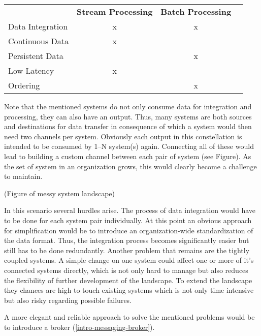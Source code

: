 \begin{table}[h]
\begin{tabular}{l|c|cl}
\multicolumn{1}{c|}{\textbf{}} & \textbf{Stream Processing} & \textbf{Batch
Processing} & \multicolumn{1}{c}{\textbf{}} \\ \cline{1-3}
Data Integration               & x                          & x
&                               \\
Continuous Data                & x                          &
&                               \\
Persistent Data                &                            & x
&                               \\
Low Latency                    & x                          &
&                               \\
Ordering                       &                            & x
&
\end{tabular}
\end{table}

Note that the mentioned systems do not only consume data for integration and
processing, they can also have an output. Thus, many systems are both sources and
destinations for data transfer in consequence of which a system would then need
two channels  per system. 
Obviously each output in this constellation is intended to be consumed by 1--N
system(s) again. Connecting all of these would lead to building a custom
channel between each pair of system (see Figure). As the set of system in an organization
grows, this would clearly become a challenge to maintain.

(Figure of messy system landscape)

In this scenario several hurdles arise. The process of data integration would
have to be done for each system pair individually. At this point an obvious
approach for simplification would be to introduce an organization-wide
standardization of the data format. Thus, the integration process becomes 
significantly easier but still has to be done redundantly. Another problem that
remains are the tightly coupled systems. A simple change on one system could
affect one or more of it's connected systems directly, which is not only hard to
manage but also reduces the flexibility of further development of the landscape.
To extend the landscape they chances are high to touch existing systems which is
not only time intensive but also risky regarding possible failures.

A more elegant and reliable approach to solve the mentioned problems would be to
introduce a broker (\ref{intro-messaging-broker}).


